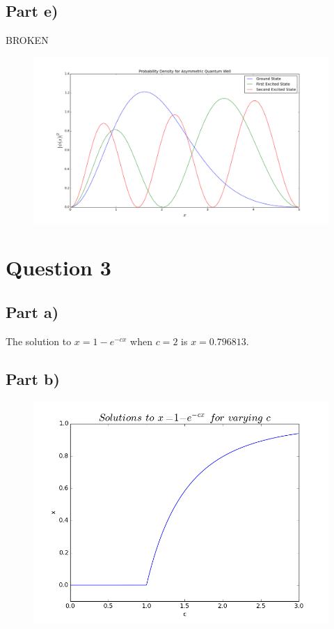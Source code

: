 \documentclass[a4paper,12pt]{article}
\begin{document}
\subsection{Part e)}

BROKEN

\begin{figure}[H]
\centering
\includegraphics[width = \linewidth]{lab4q2ei.png}
\caption{}
\label{fig:q2ei}
\end{figure}


\section{Question 3}

\subsection{Part a)}

The solution to $x = 1 - e^{-cx}$ when $c = 2$ is $x = 0.796813$.

\subsection{Part b)}

\begin{figure}[H]
\centering
\includegraphics[width = \linewidth]{lab4q3b.png}
\caption{}
\label{fig:q3}
\end{figure}
\end{document}
